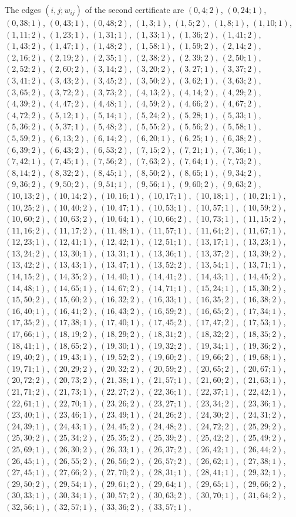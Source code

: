 \documentclass[11pt]{article}
\begin{document}
The edges $(i,j;w_{ij})$ of the second certificate are $(0,4;2)$, $(0,24;1)$, $(0,38;1)$, $(0,43;1)$, $(0,48;2)$, $(1,3;1)$, $(1,5;2)$, $(1,8;1)$, $(1,10;1)$, $(1,11;2)$, $(1,23;1)$, $(1,31;1)$, $(1,33;1)$, $(1,36;2)$, $(1,41;2)$, $(1,43;2)$, $(1,47;1)$, $(1,48;2)$, $(1,58;1)$, $(1,59;2)$, $(2,14;2)$, $(2,16;2)$, $(2,19;2)$, $(2,35;1)$, $(2,38;2)$, $(2,39;2)$, $(2,50;1)$, $(2,52;2)$, $(2,60;2)$, $(3,14;2)$, $(3,20;2)$, $(3,27;1)$, $(3,37;2)$, $(3,41;2)$, $(3,43;2)$, $(3,45;2)$, $(3,50;2)$, $(3,62;1)$, $(3,63;2)$, $(3,65;2)$, $(3,72;2)$, $(3,73;2)$, $(4,13;2)$, $(4,14;2)$, $(4,29;2)$, $(4,39;2)$, $(4,47;2)$, $(4,48;1)$, $(4,59;2)$, $(4,66;2)$, $(4,67;2)$, $(4,72;2)$, $(5,12;1)$, $(5,14;1)$, $(5,24;2)$, $(5,28;1)$, $(5,33;1)$, $(5,36;2)$, $(5,37;1)$, $(5,48;2)$, $(5,55;2)$, $(5,56;2)$, $(5,58;1)$, $(5,59;2)$, $(6,13;2)$, $(6,14;2)$, $(6,20;1)$, $(6,25;1)$, $(6,38;2)$, $(6,39;2)$, $(6,43;2)$, $(6,53;2)$, $(7,15;2)$, $(7,21;1)$, $(7,36;1)$, $(7,42;1)$, $(7,45;1)$, $(7,56;2)$, $(7,63;2)$, $(7,64;1)$, $(7,73;2)$, $(8,14;2)$, $(8,32;2)$, $(8,45;1)$, $(8,50;2)$, $(8,65;1)$, $(9,34;2)$, $(9,36;2)$, $(9,50;2)$, $(9,51;1)$, $(9,56;1)$, $(9,60;2)$, $(9,63;2)$, $(10,13;2)$, $(10,14;2)$, $(10,16;1)$, $(10,17;1)$, $(10,18;1)$, $(10,21;1)$, $(10,25;2)$, $(10,40;2)$, $(10,47;1)$, $(10,53;1)$, $(10,57;1)$, $(10,59;2)$, $(10,60;2)$, $(10,63;2)$, $(10,64;1)$, $(10,66;2)$, $(10,73;1)$, $(11,15;2)$, $(11,16;2)$, $(11,17;2)$, $(11,48;1)$, $(11,57;1)$, $(11,64;2)$, $(11,67;1)$, $(12,23;1)$, $(12,41;1)$, $(12,42;1)$, $(12,51;1)$, $(13,17;1)$, $(13,23;1)$, $(13,24;2)$, $(13,30;1)$, $(13,31;1)$, $(13,36;1)$, $(13,37;2)$, $(13,39;2)$, $(13,42;2)$, $(13,43;1)$, $(13,47;1)$, $(13,52;2)$, $(13,54;1)$, $(13,71;1)$, $(14,15;2)$, $(14,35;2)$, $(14,40;1)$, $(14,41;2)$, $(14,43;1)$, $(14,45;2)$, $(14,48;1)$, $(14,65;1)$, $(14,67;2)$, $(14,71;1)$, $(15,24;1)$, $(15,30;2)$, $(15,50;2)$, $(15,60;2)$, $(16,32;2)$, $(16,33;1)$, $(16,35;2)$, $(16,38;2)$, $(16,40;1)$, $(16,41;2)$, $(16,43;2)$, $(16,59;2)$, $(16,65;2)$, $(17,34;1)$, $(17,35;2)$, $(17,38;1)$, $(17,40;1)$, $(17,45;2)$, $(17,47;2)$, $(17,53;1)$, $(17,66;1)$, $(18,19;2)$, $(18,29;2)$, $(18,31;2)$, $(18,32;2)$, $(18,35;2)$, $(18,41;1)$, $(18,65;2)$, $(19,30;1)$, $(19,32;2)$, $(19,34;1)$, $(19,36;2)$, $(19,40;2)$, $(19,43;1)$, $(19,52;2)$, $(19,60;2)$, $(19,66;2)$, $(19,68;1)$, $(19,71;1)$, $(20,29;2)$, $(20,32;2)$, $(20,59;2)$, $(20,65;2)$, $(20,67;1)$, $(20,72;2)$, $(20,73;2)$, $(21,38;1)$, $(21,57;1)$, $(21,60;2)$, $(21,63;1)$, $(21,71;2)$, $(21,73;1)$, $(22,27;2)$, $(22,36;1)$, $(22,37;1)$, $(22,42;1)$, $(22,61;1)$, $(22,70;1)$, $(23,26;2)$, $(23,27;1)$, $(23,34;2)$, $(23,36;1)$, $(23,40;1)$, $(23,46;1)$, $(23,49;1)$, $(24,26;2)$, $(24,30;2)$, $(24,31;2)$, $(24,39;1)$, $(24,43;1)$, $(24,45;2)$, $(24,48;2)$, $(24,72;2)$, $(25,29;2)$, $(25,30;2)$, $(25,34;2)$, $(25,35;2)$, $(25,39;2)$, $(25,42;2)$, $(25,49;2)$, $(25,69;1)$, $(26,30;2)$, $(26,33;1)$, $(26,37;2)$, $(26,42;1)$, $(26,44;2)$, $(26,45;1)$, $(26,55;2)$, $(26,56;2)$, $(26,57;2)$, $(26,62;1)$, $(27,38;1)$, $(27,45;1)$, $(27,66;2)$, $(27,70;2)$, $(28,31;1)$, $(28,41;1)$, $(29,32;1)$, $(29,50;2)$, $(29,54;1)$, $(29,61;2)$, $(29,64;1)$, $(29,65;1)$, $(29,66;2)$, $(30,33;1)$, $(30,34;1)$, $(30,57;2)$, $(30,63;2)$, $(30,70;1)$, $(31,64;2)$, $(32,56;1)$, $(32,57;1)$, $(33,36;2)$, $(33,57;1)$, 
\end{document}

